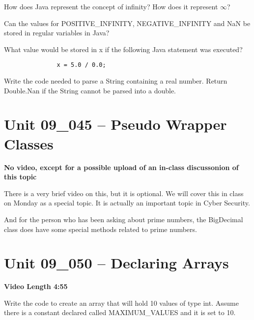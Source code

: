 \documentclass[letterpaper,12pt]{exam}
\newcommand{\unit}{Unit 09}
\begin{document}
\begin{questions}
\begin{samepage}
    \question How does Java represent the concept of infinity?  How does it represent $\infty$?
    \vspace{5mm}
\end{samepage}

\begin{samepage}
    \question Can the values for POSITIVE\_INFINITY, NEGATIVE\_INFINITY and NaN be stored in regular variables in Java?
    \vspace{5mm}
\end{samepage}

\begin{samepage}
    \question What value would be stored in x if the following Java statement was executed?
    \begin{verbatim}
               x = 5.0 / 0.0;
    \end{verbatim}
    \vspace{5mm}
\end{samepage}


\begin{samepage}
    \question Write the code needed to parse a String containing a real number.  Return Double.Nan if the String cannot be parsed into a double.
    \vspace{5mm}
\end{samepage}

\section*{\unit\_045 -- Pseudo Wrapper Classes} 
\par{\selectfont\textbf{No video, except for a possible upload of an in-class discussonion of this topic}}

There is a very brief video on this, but it is optional.  We will cover this in class on Monday as a special topic.  It is actually an important topic in Cyber Security.

And for the person who has been asking about prime numbers, the BigDecimal class does have some special methods related to prime numbers.

\section*{\unit\_050 -- Declaring Arrays} 
\par{\selectfont\textbf{Video Length 4:55}}

\begin{samepage}
    \question Write the code to create an array that will hold 10 values of type int.  Assume there is a constant declared called MAXIMUM\_VALUES and it is set to 10.
    \vspace{5mm}
\end{samepage}


\end{questions}
\end{document}
